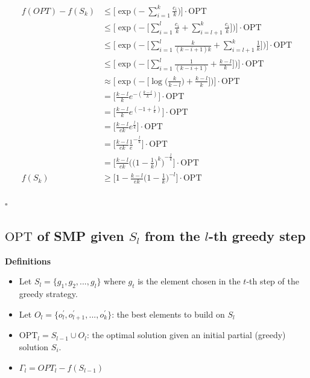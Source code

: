 \documentclass{article}
\begin{document}
\[\begin{aligned}
    f(OPT) - f(S_k) & \leq \Big[\exp\!\Big(-\sum_{i=1}^k \frac{c_i}{k}\Big)\Big]\cdot\mathrm{OPT}\\
            & \leq \Big[\exp\!\Big(-\Big[\sum_{i=1}^l \frac{c_i}{k} + \sum_{i=l + 1}^k \frac{c_i}{k} \Big]\Big)\Big]\cdot\mathrm{OPT} \\
            & \leq \Big[\exp\!\Big(-\Big[\sum_{i=1}^l \frac{k}{(k - i + 1)k} + \sum_{i=l + 1}^k \frac{1}{k} \Big]\Big)\Big]\cdot\mathrm{OPT} \\
            & \leq \Big[\exp\!\Big(-\Big[\sum_{i=1}^l \frac{1}{(k - i + 1)} + \frac{k - l}{k} \Big]\Big)\Big]\cdot\mathrm{OPT} \\
            & \approx \Big[\exp\!\Big(-\Big[\log\Big(\frac{k}{k - l}\Big) + \frac{k - l}{k} \Big]\Big)\Big]\cdot\mathrm{OPT} \\
            &= \Big[\frac{k - l}{k} e ^{-(\frac{k - l}{k})}\Big]\cdot\mathrm{OPT} \\
            &= \Big[\frac{k - l}{k} e ^{(-1 + \frac{l}{k})}\Big]\cdot\mathrm{OPT} \\
            &= \Big[\frac{k - l}{ek} e ^{\frac{l}{k}}\Big]\cdot\mathrm{OPT} \\
            &= \Big[\frac{k - l}{ek} \frac{1}{e} ^{-\frac{l}{k}}\Big]\cdot\mathrm{OPT} \\
            &= \Big[\frac{k - l}{ek} {\Big(\Big(1 - \frac{1}{k}\Big)^k\Big)}^{-\frac{l}{k}}\Big]\cdot\mathrm{OPT} \\
    f(S_k) &\geq         \Big[1 - \frac{k - l}{ek} {\Big(1 - \frac{1}{k}\Big) ^ {-l}}\Big]\cdot\mathrm{OPT} \\
\end{aligned}
\]
\begin{flushright}
    $\square$
\end{flushright}

\subsection{$\mathrm{OPT}$ of SMP given $S_l$ from the $l$-th greedy step}

\textbf{Definitions}
\begin{itemize}
    \item Let $S_l = \{g_1, g_2, ..., g_l\}$ where $g_t$ is the element chosen in the $t$-th step of the greedy strategy.
    \item Let $O_l = \{o^{'}_{l}, o^{'}_{l + 1}, ..., o^{'}_{k}\}$: the best elements to build on $S_l$
    \item $\mathrm{OPT}_l = S_{l-1} \cup O_l$: the optimal solution given an initial partial (greedy) solution $S_i$.
    \item $\Gamma_l = OPT_l - f(S_{l-1})$
\end{itemize}
\end{document}
